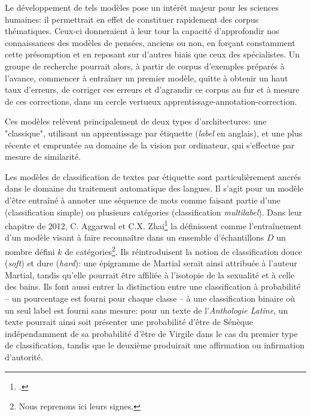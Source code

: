 Le développement de tels modèles pose un intérêt majeur pour les sciences humaines: il permettrait en effet de constituer rapidement des corpus thématiques. Ceux-ci donneraient à leur tour la capacité d'approfondir nos connaissances des modèles de pensées, anciens ou non, en forçant constamment cette présomption et en reposant sur d'autres biais que ceux des spécialistes. Un groupe de recherche pourrait alors, à partir de corpus d'exemples préparés à l'avance, commencer à entraîner un premier modèle, quitte à obtenir un haut taux d'erreurs, de corriger ces erreurs et d'agrandir ce corpus au fur et à mesure de ces corrections, dans un cercle vertueux apprentissage-annotation-correction. 

Ces modèles relèvent principalement de deux types d'architectures: une "classique", utilisant un apprentissage par étiquette (\textit{label} en anglais), et une plus récente et empruntée au domaine de la vision par ordinateur, qui s'effectue par mesure de similarité.

Les modèles de classification de textes par étiquette sont particulièrement ancrés dans le domaine du traitement automatique des langues. Il s'agit pour un modèle d'être entraîné à annoter une séquence de mots comme faisant partie d'une (classification simple) ou plusieurs catégories (classification \textit{multilabel}). Dans leur chapitre de 2012, C. Aggarwal et C.X. Zhai\footcite{aggarwal_survey_2012} la définissent comme l'entraînement d'un modèle visant à faire reconnaître dans un ensemble d'échantillons $D$ un nombre défini $k$ de catégories\footnote{Nous reprenons ici leurs signes.}. Ils réintroduisent la notion de classification douce (\textit{soft}) et dure (\textit{hard}): une épigramme de Martial serait ainsi attribuée à l'auteur Martial, tandis qu'elle pourrait être affiliée à l'isotopie de la sexualité et à celle des bains. Ils font aussi entrer la distinction entre une classification à probabilité -- un pourcentage est fourni pour chaque classe -- à une classification binaire où un seul label est fourni sans mesure: pour un texte de l'\textit{Anthologie Latine}, un texte pourrait ainsi soit présenter une probabilité d'être de Sénèque indépendamment de sa probabilité d'être de Virgile dans le cas du premier type de classification, tandis que le deuxième produirait une affirmation ou infirmation d'autorité.


